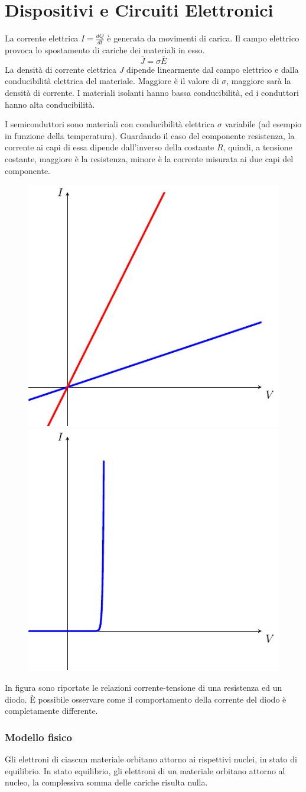 \documentclass[../template]{subfiles}
\newcommand{\idiff}{\ensuremath{I = \frac{dQ}{dt}}}
\begin{document}
\section{Dispositivi e Circuiti Elettronici}
La corrente elettrica $\idiff$ è generata da movimenti di carica. Il campo elettrico provoca lo spostamento di cariche dei materiali in esso.
\[
    \overline{J} = \sigma \overline{E}
\]
La densità di corrente elettrica $J$ dipende linearmente dal campo elettrico e dalla conducibilità elettrica del materiale.
Maggiore è il valore di $\sigma$, maggiore sarà la densità di corrente. I materiali isolanti hanno bassa conducibilità, ed i conduttori hanno alta conducibilità.

I semiconduttori sono materiali con conducibilità elettrica $\sigma$ variabile (ad esempio in funzione della temperatura).
Guardando il caso del componente resistenza, la corrente ai capi di essa dipende dall'inverso della costante $R$, quindi, a tensione costante, maggiore è la resistenza, minore è la corrente misurata ai due capi del componente.

\begin{figure}[h]
    \centering
    \includegraphics[width=.30\textwidth]{img/resistence-current}
    \includegraphics[width=.30\textwidth]{img/diode-current-graph}
\end{figure}
In figura sono riportate le relazioni corrente-tensione di una resistenza ed un diodo. È possibile osservare come il comportamento della corrente del diodo è completamente differente.

\subsubsection{Modello fisico}
Gli elettroni di ciascun materiale orbitano attorno ai rispettivi nuclei, in stato di equilibrio.
In stato equilibrio, gli elettroni di un materiale orbitano attorno al nucleo, la complessiva somma delle cariche risulta nulla.
\end{document}
